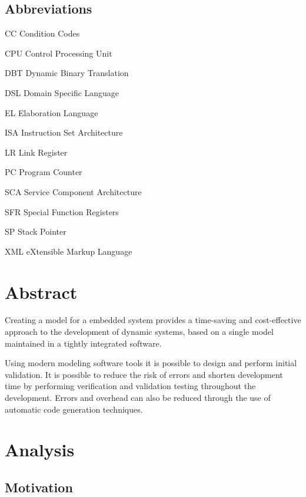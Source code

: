 \documentclass{report}
\newenvironment{abbreviations}{\begin{list}{}{\renewcommand{\makelabel}{\abbrlabel}}}{\end{list}}
\newcommand{\abbrlabel}[1]{\makebox[3cm][l]{\textbf{#1}\ \dotfill}}
\begin{document}
\section*{Abbreviations}
\begin{abbreviations} 
	\item[CC] Condition Codes
	\item[CPU] Control Processing Unit
	\item[DBT] Dynamic Binary Translation
	\item[DSL] Domain Specific Language
	\item[EL] Elaboration Language
	\item[ISA] Instruction Set Architecture
	\item[LR] Link Register
	\item[PC] Program Counter
	\item[SCA] Service Component Architecture
	\item[SFR] Special Function Registers
	\item[SP] Stack Pointer
	\item[XML] eXtensible Markup Language
\end{abbreviations}
\newpage
\chapter{Abstract}

\par Creating a model for a embedded system provides a time-saving and cost-effective approach to the development of dynamic systems, based on a single model maintained in a tightly integrated software. 
\par Using modern modeling software tools it is possible to design and perform initial validation. It is possible to reduce the risk of errors and shorten development time by performing verification and validation testing throughout the development. Errors and overhead can also be reduced through the use of automatic code generation techniques\cite{j.h.foleissa.l.t.d'amatoa.f.dasilva2012}.

\chapter{Analysis}

	\section{Motivation}
	
\end{document}
